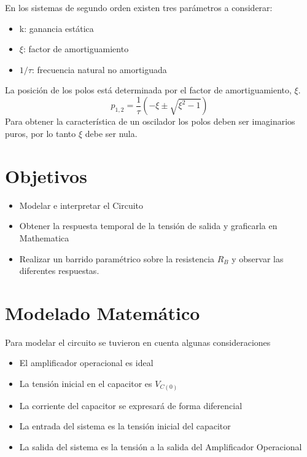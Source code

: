 \documentclass[10pt,a4paper]{article} %
\begin{document}
En los sistemas de segundo orden existen tres parámetros a considerar:
    \begin{itemize} 
    	\item k: ganancia estática
    	\item $\xi$: factor de amortiguamiento
    	\item $1/\tau$: frecuencia natural no amortiguada
    \end{itemize}
       La posición de los polos está determinada por el factor de amortiguamiento, $\xi$. 
       \begin{equation*}
       p_{1,2}=\frac{1}{\tau}\left(-\xi\pm\sqrt{\xi^2-1}\right)
       \end{equation*}
       Para obtener la característica de un oscilador los polos deben ser imaginarios puros, por lo tanto 
       $\xi$ debe ser nula. 
 

\section{Objetivos}
\begin{itemize}
    \item Modelar e interpretar el Circuito
    \item Obtener la respuesta temporal de la tensión de salida y graficarla en Mathematica
    \item Realizar un barrido paramétrico sobre la resistencia $R_B$ y observar las diferentes respuestas.
\end{itemize}

\section{Modelado Matemático}
Para modelar el circuito se tuvieron en cuenta algunas consideraciones

\begin{itemize}
    \item El amplificador operacional es ideal
    \item La tensión inicial en el capacitor es $V_{C(0)}$
    \item La corriente del capacitor se expresará de forma diferencial
    \item La entrada del sistema es la tensión inicial del capacitor
    \item La salida del sistema es la tensión a la salida del Amplificador Operacional
\end{itemize}
\end{document}
